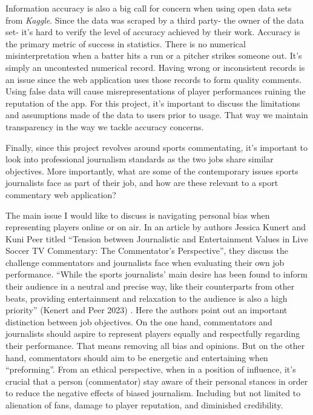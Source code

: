 \documentclass[10pt,twocolumn]{article}
\begin{document}
Information accuracy is also a big call for concern when using open data sets from \textit{Kaggle}. Since the data was scraped by a third party- the owner of the data set- it's hard to verify the level of accuracy achieved by their work. Accuracy is the primary metric of success in statistics. There is no numerical misinterpretation when a batter hits a run or a pitcher strikes someone out. It's simply an uncontested numerical record. Having wrong or inconsistent records is an issue since the web application uses those records to form quality comments. Using false data will cause misrepresentations of player performances ruining the reputation of the app. For this project, it's important to discuss the limitations and assumptions made of the data to users prior to usage. That way we maintain transparency in the way we tackle accuracy concerns.

Finally, since this project revolves around sports commentating, it's important to look into professional journalism standards as the two jobs share similar objectives. More importantly, what are some of the contemporary issues sports journalists face as part of their job, and how are these relevant to a sport commentary web application? 

The main issue I would like to discuss is navigating personal bias when representing players online or on air. In an article by authors Jessica Kunert and Kuni Peer titled “Tension between Journalistic and Entertainment Values in Live Soccer TV Commentary: The Commentator’s Perspective”, they discuss the challenge commentators and journalists face when evaluating their own job performance. “While the sports journalists’ main desire has been found to inform their audience in a neutral and precise way, like their counterparts from other beats, providing entertainment and relaxation to the audience is also a high priority” (Kenert and Peer 2023) \cite{kunert2023}. Here the authors point out an important distinction between job objectives. On the one hand, commentators and journalists should aspire to represent players equally and respectfully regarding their performance. That means removing all bias and opinions. But on the other hand, commentators should aim to be energetic and entertaining when “preforming”. From an ethical perspective, when in a position of influence, it's crucial that a person (commentator) stay aware of their personal stances in order to reduce the negative effects of biased journalism. Including but not limited to alienation of fans, damage to player reputation, and diminished credibility. 
\end{document}
